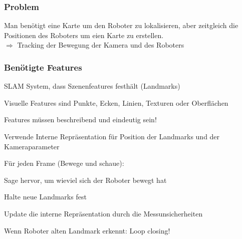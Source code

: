 \subsubsection{Problem}
Man benötigt eine Karte um den Roboter zu lokalisieren, aber zeitgleich die
Positionen des Roboters um eien Karte zu erstellen. \\
$\Rightarrow$ Tracking der Bewegung der Kamera und des Roboters

\subsubsection{Benötigte Features}
\begin{compactitem}
    \item SLAM System, dass Szenenfeatures festhält (Landmarks)
    \item Visuelle Features sind Punkte, Ecken, Linien, Texturen oder Oberflächen
    \item Features müssen beschreibend und eindeutig sein!
\end{compactitem}

\begin{compactitem}
    \item Verwende Interne Repräsentation für Position der Landmarks und der Kameraparameter
    \item Für jeden Frame (Bewege und schaue):
    \begin{compactitem}
        \item Sage hervor, um wieviel sich der Roboter bewegt hat
        \item Halte neue Landmarks fest
        \item Update die interne Repräsentation durch die Messunsicherheiten
    \end{compactitem}
    Wenn Roboter alten Landmark erkennt: Loop closing!
\end{compactitem}
